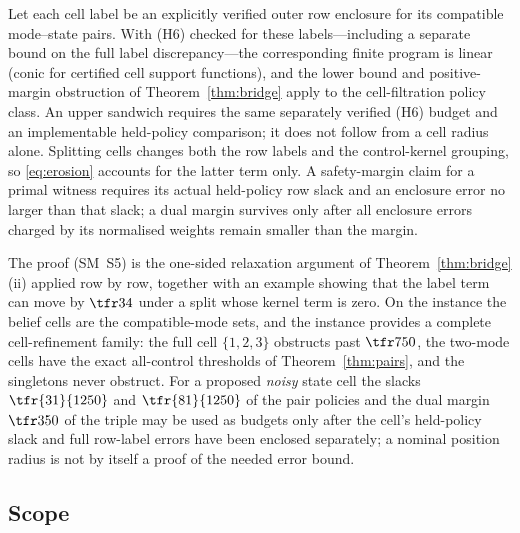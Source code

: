 \begin{proposition}\label{prop:beliefcells}
Let each cell label be an explicitly verified outer row enclosure for its compatible mode--state pairs. With \textup{(H6)} checked for these labels---including a separate bound on the full label discrepancy---the corresponding finite program is linear (conic for certified cell support functions), and the lower bound and positive-margin obstruction of Theorem~\ref{thm:bridge} apply to the cell-filtration policy class. An upper sandwich requires the same separately verified \textup{(H6)} budget and an implementable held-policy comparison; it does not follow from a cell radius alone. Splitting cells changes both the row labels and the control-kernel grouping, so \eqref{eq:erosion} accounts for the latter term only. A safety-margin claim for a primal witness requires its actual held-policy row slack and an enclosure error no larger than that slack; a dual margin survives only after all enclosure errors charged by its normalised weights remain smaller than the margin.
\end{proposition}

The proof (SM~S5) is the one-sided relaxation argument of Theorem~\ref{thm:bridge}(ii) applied row by row, together with an example showing that the label term can move by $\tfr34$ under a split whose kernel term is zero. On the instance the belief cells are the compatible-mode sets, and the instance provides a complete cell-refinement family: the full cell $\{1,2,3\}$ obstructs past $\tfr7{50}$, the two-mode cells have the exact all-control thresholds of Theorem~\ref{thm:pairs}, and the singletons never obstruct. For a proposed \emph{noisy} state cell the slacks $\tfr{31}{1250}$ and $\tfr{81}{1250}$ of the pair policies and the dual margin $\tfr3{50}$ of the triple may be used as budgets only after the cell's held-policy slack and full row-label errors have been enclosed separately; a nominal position radius is not by itself a proof of the needed error bound.

\subsection{Scope}\label{sec:scope}

